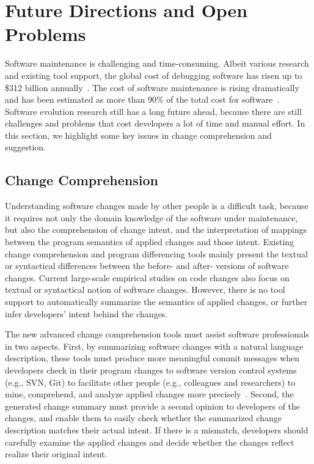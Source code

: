 \section{Future Directions and Open Problems} 

Software maintenance is challenging and time-consuming. Albeit various research and existing tool support, the global cost of debugging software has risen up to \$312 billion annually~\cite{globalcost}. The cost of software maintenance is rising dramatically and has been estimated as more than 90\% of the total cost for software~\cite{Omnext2010}. Software evolution research still has a long future ahead, because there are still challenges and problems that cost developers a lot of time and manual effort. In this section, we highlight some key issues in change comprehension and suggestion.

\subsection{Change Comprehension}
Understanding software changes made by other people is a difficult task, because it requires not only the domain knowledge of the software under maintenance, but also the comprehension of change intent, and the interpretation of mappings between the program semantics of applied changes and those intent. Existing change comprehension and program differencing tools mainly present the textual or syntactical differences between the before- and after- versions of software changes. Current large-scale empirical studies on code changes also focus on textual or syntactical notion of software changes. However, there is no tool support to automatically summarize the semantics of applied changes, or further infer developers' intent behind the changes. 

The new advanced change comprehension tools must assist software professionals in two aspects. First, by summarizing software changes with a natural language description, these tools must produce more meaningful commit messages when developers check in their program changes to software version control systems (e.g., SVN, Git) to facilitate other people (e.g., colleagues and researchers) to mine, comprehend, and analyze applied changes more precisely~\cite{herzig2013impact}. Second, the generated change summary must provide a second opinion to developers of the changes, and enable them to easily check whether the summarized change description matches their actual intent. If there is a mismatch, developers should carefully examine the applied changes and decide whether the changes reflect realize their original intent. 

